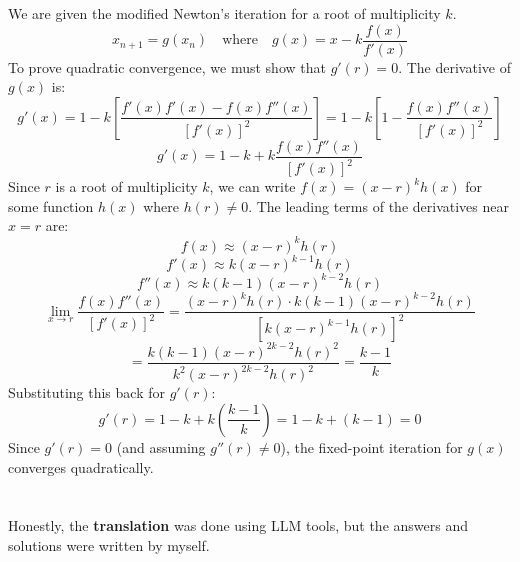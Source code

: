 \documentclass[a4paper]{article}
\begin{document}
We are given the modified Newton's iteration for a root of multiplicity $k$.
\[
x_{n+1} = g(x_n) \quad \text{where} \quad g(x) = x - k\frac{f(x)}{f'(x)}
\]
To prove quadratic convergence, we must show that $g'(r)=0$.
The derivative of $g(x)$ is:
\[
g'(x) = 1 - k \left[ \frac{f'(x)f'(x) - f(x)f''(x)}{[f'(x)]^2} \right] = 1 - k \left[ 1 - \frac{f(x)f''(x)}{[f'(x)]^2} \right]
\]
\[
g'(x) = 1 - k + k\frac{f(x)f''(x)}{[f'(x)]^2}
\]
Since $r$ is a root of multiplicity $k$, we can write $f(x) = (x-r)^k h(x)$ for some function $h(x)$ where $h(r) \ne 0$.
The leading terms of the derivatives near $x=r$ are:
\[
f(x) \approx (x-r)^k h(r)
\]
\[
f'(x) \approx k(x-r)^{k-1} h(r)
\]
\[
f''(x) \approx k(k-1)(x-r)^{k-2} h(r)
\]
\[
\lim_{x \to r} \frac{f(x)f''(x)}{[f'(x)]^2} = \frac{(x-r)^k h(r) \cdot k(k-1)(x-r)^{k-2} h(r)}{[k(x-r)^{k-1} h(r)]^2}
\]
\[
= \frac{k(k-1)(x-r)^{2k-2}h(r)^2}{k^2(x-r)^{2k-2}h(r)^2} = \frac{k-1}{k}
\]
Substituting this back for $g'(r)$:
\[
g'(r) = 1 - k + k \left(\frac{k-1}{k}\right) = 1 - k + (k-1) = 0
\]
Since $g'(r)=0$ (and assuming $g''(r) \ne 0$), the fixed-point iteration for $g(x)$ converges quadratically.
















\section*{  }
Honestly, the \textbf{translation} was done using LLM tools, but the answers and solutions were written by myself.



\end{document}
